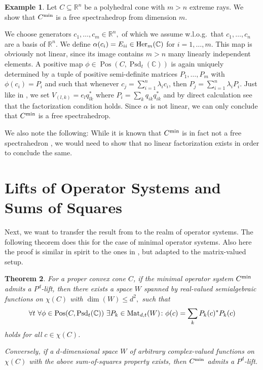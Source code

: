 \documentclass[11pt,onecolumn]{article}
\theoremstyle{plain}
\newtheorem{theorem}{Theorem}[section]
\theoremstyle{definition}
\newtheorem{example}[theorem]{Example}
\newcommand{\C}{\mathbb{C}}
\newcommand{\R}{\mathbb{R}}
\begin{document}
\begin{example}
Let \(C \subseteq \R^n\) be a polyhedral cone with \(m > n\) extreme rays. We show that \(C^\textnormal{min}\) is a free spectrahedrop from dimension  \(m\).

We choose generators \(c_1, \dots, c_m \in \R^n,\) of which we assume w.l.o.g.\ that $c_1,\ldots, c_n$ are a basis of $\R^n$.
We define \(\alpha(c_i) = E_{ii}\in{\rm Her}_m(\C)\) for \(i = 1, \dots, m\). This map is obviously not linear, since its image contains \(m > n\) many linearly independent elements.  A positive map \(\phi\in \operatorname{Pos}(C, \operatorname{Psd}_t(\C))\) is again uniquely determined by a tuple of positive semi-definite matrices \(P_1, \dots, P_m\) with \(\phi(c_i) = P_i\) and such that whenever \(c_j = \sum_{i=1}^n \lambda_i c_i\), then \(P_j = \sum_{i=1}^n \lambda_i P_i\). Just like in 
, we set \(V_{(l, k)} = e_l q_{lk}^*\) where \(P_i = \sum_k q_{ik} q_{ik}^*\) and by direct calculation see that the factorization condition holds. Since \(\alpha\) is not linear, we can only conclude that \(C^\textnormal{min}\) is a free spectrahedrop. 

We also note the following: While it is known that \(C^\textnormal{min}\) is in fact not a free spectrahedron \cite{fnt}, we would need to show that no linear factorization exists in order to conclude the same.
\end{example}

\section{Lifts of Operator Systems and Sums of Squares}

Next, we want to transfer the result from   to the realm of operator systems. The following theorem does this for the case of minimal operator systems. Also here the proof is similar in spirit to the ones in \cite{faw,schei}, but adapted to the matrix-valued setup.

\begin{theorem} \label{thm:NC_lift_iff_SOHS}
	For a proper convex cone $C$, if the minimal operator system \(C^\textnormal{min}\)
	 admits a \(P^d\)-lift, then there exists a space \(W\)  spanned by  real-valued semialgebraic functions on \(\chi(C)\) with \(\dim(W) \leqslant d^2,\) such that \[\forall t\ \forall \phi \in {\rm Pos}(C,{\rm Psd}_t(\C)) \ \exists P_k \in \operatorname{Mat}_{d,t}(W)\colon \phi(c) = \sum_k P_k(c)^* P_k(c)\] holds for all \(c \in \chi(C)\).
	
	Conversely, if a \(d\)-dimensional space \(W\) of arbitrary complex-valued functions on \(\chi(C)\) with the above sum-of-squares property exists, then \(C^\textnormal{min}\) admits a \(P^d\)-lift.
\end{theorem}
\end{document}
